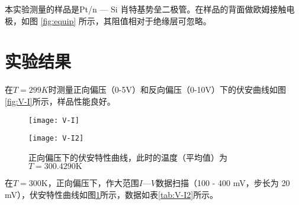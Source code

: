 \documentclass[aps,pre,12pt,preprint,onecolumn,showpacs,showkeys]{revtex4-1}
\begin{document}
    本实验测量的样品是Pt/n — Si 肖特基势垒二极管。在样品的背面做欧姆接触电极，如图 \ref{fig:equip} 所示，其阻值相对于绝缘层可忽略。

\section{实验结果}
    在$T=299K$时测量正向偏压（0-5V）和反向偏压（0-10V）下的伏安曲线如图 \ref{fig:V-I}所示，样品性能良好。
    \begin{figure}[ht]
        \begin{minipage}[t]{0.48\textwidth}
            \centering
            \texttt{[image: V-I]}
            \caption{\label{fig:V-I}%
            双向偏压下的伏安特性曲线，此时的温度（平均值）为$T=298.9964\mathrm K$}
        \end{minipage}
        \begin{minipage}[t]{0.48\textwidth}
            \centering
            \texttt{[image: V-I2]}
            \caption{\label{fig:V-I2}%
            正向偏压下的伏安特性曲线，此时的温度（平均值）为$T=300.4290\mathrm K$}
        \end{minipage}
        
    \end{figure}

    在$T=300\mathrm K$，正向偏压下，作大范围$I$—$V$数据扫描（100 - 400 mV，步长为 20 mV），伏安特性曲线如图\ref{fig:V-I2}所示，数据如表\ref{tab:V-I2}所示。
\end{document}

